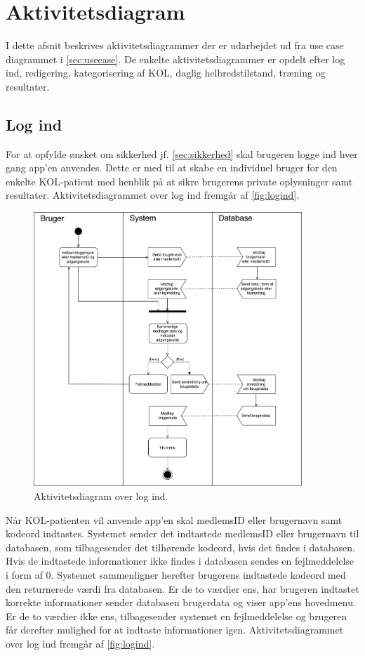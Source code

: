 \section{Aktivitetsdiagram}
I dette afsnit beskrives aktivitetsdiagrammer der er udarbejdet ud fra use case diagrammet i \autoref{sec:usecase}. De enkelte aktivitetsdiagrammer er opdelt efter log ind, redigering, kategorisering af KOL, daglig helbredstilstand, træning og resultater.    

\subsection{Log ind}
For at opfylde ønsket om sikkerhed jf. \autoref{sec:sikkerhed} skal brugeren logge ind hver gang app'en anvendes. Dette er med til at skabe en individuel bruger for den enkelte KOL-patient med henblik på at sikre brugerens private oplysninger samt resultater. Aktivitetsdiagrammet over log ind fremgår af \autoref{fig:logind}. 


\begin{figure} [H]
\centering
\includegraphics[width=0.9\textwidth]{figures/aktivitetsdiagram/Logind}
\caption{Aktivitetsdiagram over log ind.}
\label{fig:logind}
\end{figure}

\noindent
Når KOL-patienten vil anvende app'en skal medlemsID eller brugernavn samt kodeord indtastes. Systemet sender det indtastede medlemsID eller brugernavn til databasen, som tilbagesender det tilhørende kodeord, hvis det findes i databasen. Hvis de indtastede informationer ikke findes i databasen sendes en fejlmeddelelse i form af 0. Systemet sammenligner herefter brugerens indtastede kodeord med den returnerede værdi fra databasen. Er de to værdier ens, har brugeren indtastet korrekte informationer sender databasen brugerdata og viser app'ens hovedmenu. Er de to værdier ikke ens, tilbagesender systemet en fejlmeddelelse og brugeren får derefter mulighed for at indtaste informationer igen. Aktivitetsdiagrammet over log ind fremgår af \autoref{fig:logind}.





